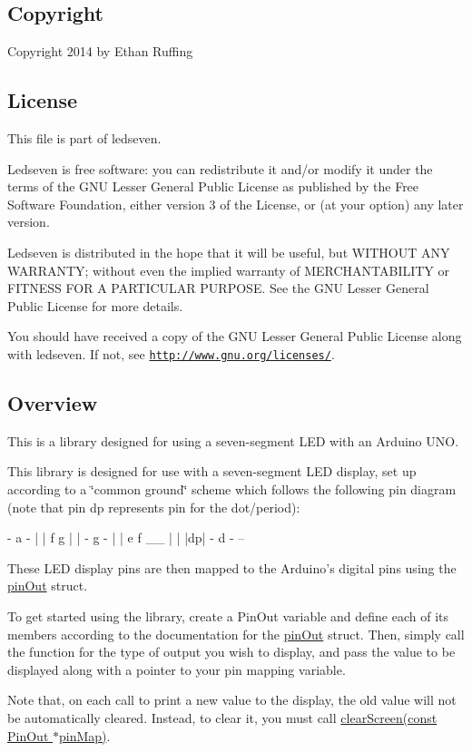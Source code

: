 \subsection*{Copyright }

Copyright 2014 by Ethan Ruffing

\subsection*{License }

This file is part of ledseven.

Ledseven is free software\+: you can redistribute it and/or modify it under the terms of the G\+N\+U Lesser General Public License as published by the Free Software Foundation, either version 3 of the License, or (at your option) any later version.

Ledseven is distributed in the hope that it will be useful, but W\+I\+T\+H\+O\+U\+T A\+N\+Y W\+A\+R\+R\+A\+N\+T\+Y; without even the implied warranty of M\+E\+R\+C\+H\+A\+N\+T\+A\+B\+I\+L\+I\+T\+Y or F\+I\+T\+N\+E\+S\+S F\+O\+R A P\+A\+R\+T\+I\+C\+U\+L\+A\+R P\+U\+R\+P\+O\+S\+E. See the G\+N\+U Lesser General Public License for more details.

You should have received a copy of the G\+N\+U Lesser General Public License along with ledseven. If not, see \href{http://www.gnu.org/licenses/}{\tt http\+://www.\+gnu.\+org/licenses/}.

\subsection*{Overview }

This is a library designed for using a seven-\/segment L\+E\+D with an Arduino U\+N\+O.

This library is designed for use with a seven-\/segment L\+E\+D display, set up according to a \char`\"{}common ground\char`\"{} scheme which follows the following pin diagram (note that pin {\ttfamily dp} represents pin for the dot/period)\+: \begin{DoxyVerb} - a -
|     |
f     g
|     |
 - g -
|     |
e     f    __
|     |   |dp|
 - d -     --
\end{DoxyVerb}


These L\+E\+D display pins are then mapped to the Arduino's digital pins using the {\ttfamily \hyperlink{structpin_out}{pin\+Out}} struct.

To get started using the library, create a {\ttfamily Pin\+Out} variable and define each of its members according to the documentation for the {\ttfamily \hyperlink{structpin_out}{pin\+Out}} struct. Then, simply call the function for the type of output you wish to display, and pass the value to be displayed along with a pointer to your pin mapping variable.

Note that, on each call to print a new value to the display, the old value will not be automatically cleared. Instead, to clear it, you must call {\ttfamily \hyperlink{ledseven_8h_abe6d5e49ec90a2d549034ecfe19e719f}{clear\+Screen(const Pin\+Out $\ast$pin\+Map)}}. 